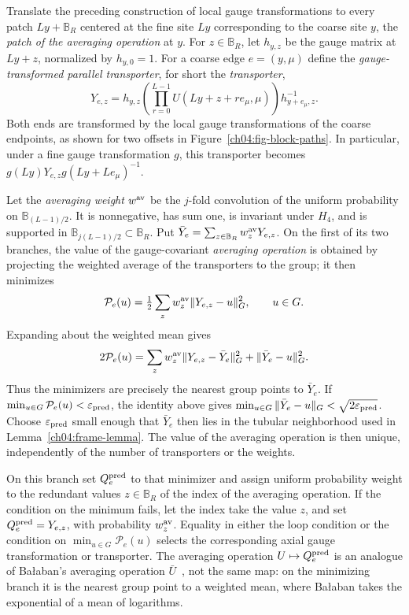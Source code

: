 Translate the preceding construction of local gauge transformations to every patch
$Ly+\mathbb B_R$ centered at the fine site $Ly$ corresponding to the coarse site $y$, the \emph{patch of the averaging operation} at $y$.
For $z\in\mathbb B_R$, let $h_{y,z}$ be the gauge matrix at $Ly+z$,
normalized by $h_{y,0}=1$. For a coarse edge $e=(y,\mu)$ define the \emph{gauge-transformed parallel transporter}, for short the \emph{transporter},
\begin{equation}
 Y_{e,z}=h_{y,z}
       \left(\prod_{r=0}^{L-1}U(Ly+z+re_\mu,\mu)\right)
                     h_{y+e_\mu,z}^{-1}.
 \label{ch04:connector}
\end{equation}
Both ends are transformed by the local gauge transformations of the coarse endpoints, as shown
for two offsets in Figure~\ref{ch04:fig-block-paths}. In
particular, under a fine gauge transformation $g$, this transporter becomes
$g(Ly)Y_{e,z}g(Ly+Le_\mu)^{-1}$.

Let the \emph{averaging weight} $w^{\rm av}$ be the $j$-fold convolution of the uniform probability
on $\mathbb B_{(L-1)/2}$. It is nonnegative, has sum one, is invariant under
$H_4$, and is supported in $\mathbb B_{j(L-1)/2}\subset\mathbb B_R$.
Put $\bar Y_e=\sum_{z\in\mathbb B_R} w_z^{\rm av}Y_{e,z}$. On the first of its two branches, the value of the gauge-covariant \emph{averaging operation} is obtained by projecting the weighted
average of the transporters to the group; it then minimizes
\begin{equation}
 \mathcal P_e(u)=\tfrac12\sum_z w_z^{\rm av}\|Y_{e,z}-u\|_G^2,\qquad u\in G.
 \label{ch04:predictor-cost}
\end{equation}
Expanding about the weighted mean gives
\[
 2\mathcal P_e(u)
 =\sum_z w_z^{\rm av}\|Y_{e,z}-\bar Y_e\|_G^2
                         +\|\bar Y_e-u\|_G^2.
\]
Thus the minimizers are precisely the nearest group points to $\bar Y_e$.
If $\min_{u\in G}\mathcal P_e(u)<\varepsilon_{\rm pred}$, the identity
above gives $\min_{u\in G}\|\bar Y_e-u\|_G
<\sqrt{2\varepsilon_{\rm pred}}$. Choose $\varepsilon_{\rm pred}$ small
enough that $\bar Y_e$ then lies in the tubular neighborhood used in
Lemma~\ref{ch04:frame-lemma}. The value of the averaging operation is then unique, independently
of the number of transporters or the weights.

On this branch set $Q_e^{\rm pred}$ to that minimizer and assign uniform
probability weight to the redundant values $z\in\mathbb B_R$ of the index of the averaging operation. If the condition on the minimum fails,
let the index take the value $z$, and set $Q_e^{\rm pred}=Y_{e,z}$, with probability
$w_z^{\rm av}$. Equality in either the loop condition or the condition on
$\min_{u\in G}\mathcal P_e(u)$ selects the corresponding axial gauge transformation
or transporter. The averaging operation $U\mapsto Q_e^{\rm pred}$ is an analogue of Ba\l{}aban's averaging operation $\bar U$~\cite{Balaban1987RG}, not the same map: on the minimizing branch it is the nearest group point to a weighted mean, where Ba\l{}aban takes the exponential of a mean of logarithms.

